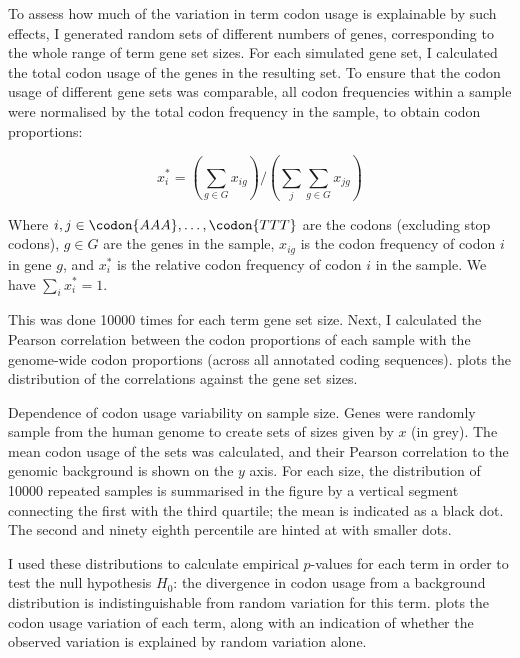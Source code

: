 To assess how much of the variation in \go term codon usage is explainable by
such effects, I generated random sets of different numbers of genes,
corresponding to the whole range of \go term gene set sizes. For each simulated
gene set, I calculated the total codon usage of the genes in the resulting set.
To ensure that the codon usage of different gene sets was comparable, all codon
frequencies within a sample were normalised by the total codon frequency in the
sample, to obtain codon proportions:

\begin{equation}
    x_i^* = \left(\sum_{g\in G} x_{ig}\right) \bigg/ \left(\sum_j \sum_{g\in G} x_{jg}\right)
\end{equation}

Where \(i, j \in \codon{AAA},\dots,\codon{TTT}\) are the codons (excluding stop
codons), \(g\in G\) are the genes in the sample, \(x_{ig}\) is the codon
frequency of codon \(i\) in gene \(g\), and \(x_i^*\) is the relative codon
frequency of codon \(i\) in the sample. We have \(\sum_i x_i^*=1\).

This was done \num{10000} times for each \go term gene set size. Next, I
calculated the Pearson correlation between the codon proportions of each sample
with the genome-wide codon proportions (across all annotated coding sequences).
 plots the distribution of the correlations
against the gene set sizes.

    {Dependence of codon usage variability on sample size.}
    {Genes were randomly sample from the human genome to create sets of sizes
    given by \(x\) (in grey). The mean codon usage of the sets was calculated,
    and their Pearson correlation to the genomic background is shown on the
    \(y\) axis. For each size, the distribution of \num{10000} repeated samples
    is summarised in the figure by a vertical segment connecting the first with
    the third quartile; the mean is indicated as a black dot. The second and
    ninety eighth percentile are hinted at with smaller dots.}

I used these distributions to calculate empirical \(p\)-values for each \go term
in order to test the null hypothesis \(H_0\): the divergence in codon usage from
a background distribution is indistinguishable from random variation for this
\go term.  plots the codon usage variation
of each \go term, along with an indication of whether the observed variation is
explained by random variation alone.

